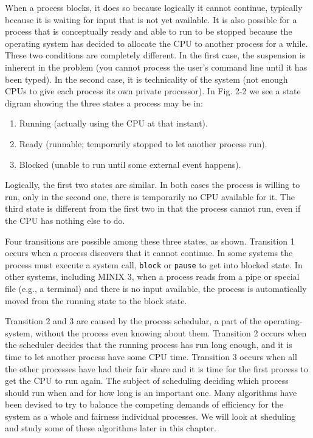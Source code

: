 \documentclass{book}
\newcommand {\cmd} [1] {\texttt{#1}}
\begin{document}
When a process blocks, it does so because logically it cannot continue, 
typically because it is waiting for input that is not yet available.
It is also possible for a process that is conceptually ready and able to run to be stopped 
because the operating system has decided to allocate the CPU to another process for a while.
These two conditions are completely different.
In the first case, the suspension is inherent in the problem 
(you cannot process the user's command line until it has been typed).
In the second case, it is technicality of the system (not enough CPUs to give each process its own private processor).
In Fig. 2-2 we see a state digram showing the three states a process may be in:
\begin{enumerate}
  \item Running (actually using the CPU at that instant).
  \item Ready (runnable; temporarily stopped to let another process run).
  \item Blocked (unable to run until some external event happens).
\end{enumerate}

Logically, the first two states are similar.
In both cases the process is willing to run, only in the second one, there is temporarily no CPU available for it.
The third state is different from the first two in that the process cannot run, even if the CPU has nothing else to do.

Four transitions are possible among these three states, as shown.
Transition 1 occurs when a process discovers that it cannot continue.
In some systems the process must execute a system call, \cmd{block} or \cmd{pause} to get into blocked state.
In other systems, including MINIX 3, when a process reads from a pipe or special file (e.g., a terminal) and there is no input available,
the process is automatically moved from the running state to the block state.

Transition 2 and 3 are caused by the process schedular, a part of the operating-system,
without the process even knowing about them.
Transition 2 occurs when the scheduler decides that the running process has run long enough,
and it is time to let another process have some CPU time.
Transition 3 occurs when all the other processes have had their fair share 
and it is time for the first process to get the CPU to run again.
The subject of scheduling deciding which process should run when and for how long is an important one.
Many algorithms have been devised to try to 
balance the competing demands of efficiency for the system as a whole and fairness individual processes.
We will look at sheduling and study some of these algorithms later in this chapter.
\end{document}
